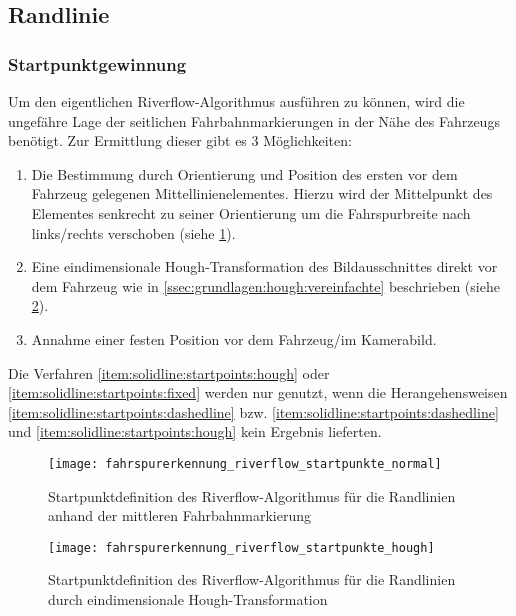 \subsection{Randlinie \dcsecondauthorshort} \label{ssec:fahrspurerkennung:riverflow:randlinie}
\subsubsection{Startpunktgewinnung}
Um den eigentlichen Riverflow-Algorithmus ausführen zu können, wird die ungefähre Lage der seitlichen Fahrbahnmarkierungen in der Nähe des Fahrzeugs benötigt. Zur Ermittlung dieser gibt es 3 Möglichkeiten:
\begin{enumerate}
\item \label{item:solidline:startpoints:dashedline}
Die Bestimmung durch Orientierung und Position des ersten vor dem Fahrzeug gelegenen Mittellinienelementes. Hierzu wird der Mittelpunkt des Elementes senkrecht zu seiner Orientierung um die Fahrspurbreite nach links/rechts verschoben (siehe \ref{fig:riverflow:randlinien:startpoints:dashedline}).
\item \label{item:solidline:startpoints:hough}
Eine eindimensionale Hough-Transformation des Bildausschnittes direkt vor dem Fahrzeug wie in \ref{ssec:grundlagen:hough:vereinfachte} beschrieben (siehe \ref{fig:riverflow:randlinien:startpoints:hough}). 
\item \label{item:solidline:startpoints:fixed}
Annahme einer festen Position vor dem Fahrzeug/im Kamerabild.
\end{enumerate}

Die Verfahren \ref{item:solidline:startpoints:hough} oder \ref{item:solidline:startpoints:fixed} werden nur genutzt, wenn die Herangehensweisen \ref{item:solidline:startpoints:dashedline} bzw. \ref{item:solidline:startpoints:dashedline} und \ref{item:solidline:startpoints:hough} kein Ergebnis lieferten.

\begin{figure}[H]
	\centering
	\texttt{[image: fahrspurerkennung\_riverflow\_startpunkte\_normal]}
	\caption{Startpunktdefinition des Riverflow-Algorithmus für die Randlinien anhand der mittleren Fahrbahnmarkierung}
	\label{fig:riverflow:randlinien:startpoints:dashedline}
\end{figure}

\begin{figure}[H]
	\centering
	\texttt{[image: fahrspurerkennung\_riverflow\_startpunkte\_hough]}
	\caption{Startpunktdefinition des Riverflow-Algorithmus für die Randlinien durch eindimensionale Hough-Transformation}
	\label{fig:riverflow:randlinien:startpoints:hough}
\end{figure}

